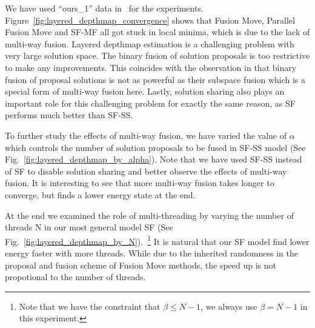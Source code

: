 
\noindent We have used ``ours\_1'' data in~\cite{layered_depthmap} for
the experiments. Figure~\ref{fig:layered_depthmap_convergence} shows
that Fusion Move, Parallel Fusion Move and SF-MF all got stuck in local
minima, which is due to the lack of multi-way fusion.  Layered depthmap
estimation is a challenging problem with very large solution space. The
binary fusion of solution proposals is too restrictive to make any
improvements.  This coincides with the observation in
\cite{layered_depthmap} that binary fusion of proposal solutions is not
as powerful as their subspace fusion which is a special form of
multi-way fusion here. Lastly, solution sharing also plays an important
role for this challenging problem for exactly the same reason, as SF
performs much better than SF-SS.

%
To further study the effects of multi-way fusion, we have varied the
value of $\alpha$ which controls the number of solution proposals to be
fused in SF-SS model (See
Fig.~\ref{fig:layered_depthmap_by_alpha}). Note that we have used SF-SS
instead of SF to disable solution sharing and better observe the effects
of multi-way fusion.
It is interesting to see that more multi-way fusion takes longer to
converge, but finds a lower energy state at the end.

At the end we examined the role of multi-threading by varying the number of threads N in our most general model SF (See Fig.~\ref{fig:layered_depthmap_by_N}).~\footnote{Note that we have the constraint that $\beta \leq N-1$, we always use $\beta = N-1$ in this experiment.}  It is natural that our SF model find lower energy faster with more threads. While due to the inherited randomness in the proposal and fusion scheme of Fusion Move methods, the speed up is not propotional to the number of threads.

